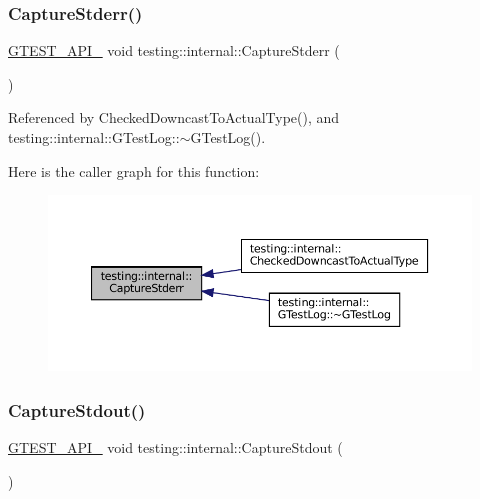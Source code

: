 \subsubsection{\texorpdfstring{Capture\+Stderr()}{CaptureStderr()}}
{\footnotesize\ttfamily \hyperlink{gtest-port_8h_aa73be6f0ba4a7456180a94904ce17790}{G\+T\+E\+S\+T\+\_\+\+A\+P\+I\+\_\+} void testing\+::internal\+::\+Capture\+Stderr (\begin{DoxyParamCaption}{ }\end{DoxyParamCaption})}



Referenced by Checked\+Downcast\+To\+Actual\+Type(), and testing\+::internal\+::\+G\+Test\+Log\+::$\sim$\+G\+Test\+Log().

Here is the caller graph for this function\+:
\nopagebreak
\begin{figure}[H]
\begin{center}
\leavevmode
\includegraphics[width=350pt]{namespacetesting_1_1internal_a8ec00d458d0d442bd64af7b5f9c22dda_icgraph}
\end{center}
\end{figure}
\mbox{\label{namespacetesting_1_1internal_acba06d4f0343dec407738ba5544af990}} 
\subsubsection{\texorpdfstring{Capture\+Stdout()}{CaptureStdout()}}
{\footnotesize\ttfamily \hyperlink{gtest-port_8h_aa73be6f0ba4a7456180a94904ce17790}{G\+T\+E\+S\+T\+\_\+\+A\+P\+I\+\_\+} void testing\+::internal\+::\+Capture\+Stdout (\begin{DoxyParamCaption}{ }\end{DoxyParamCaption})}



